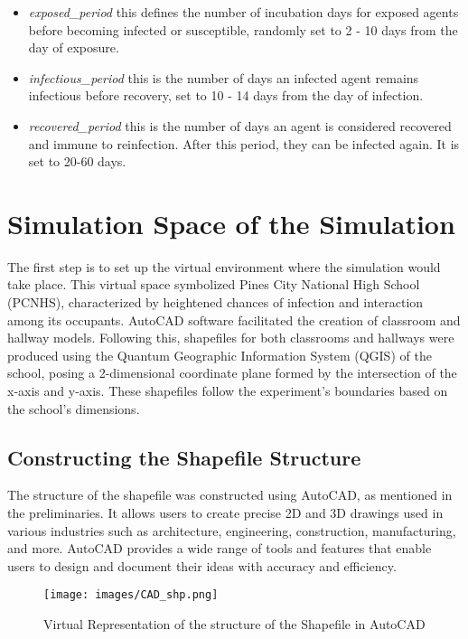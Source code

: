 \begin{itemize}
 	\item \textit{exposed\_period} this defines the number of incubation days for exposed agents before becoming infected or susceptible, randomly set to 2 - 10 days from the day of exposure.
 	
 	\item \textit{infectious\_period} this is the number of days an infected agent remains infectious before recovery, set to 10 - 14 days from the day of infection.
 	
 	\item \textit{recovered\_period} this is the number of days an agent is considered recovered and immune to reinfection. After this period, they can be infected again. It is set to 20-60 days.
 	
 \end{itemize}
 
  \section{Simulation Space of the Simulation}
 
 
 The first step is to set up the virtual environment where the simulation would take place. This virtual space symbolized Pines City National High School (PCNHS), characterized by heightened chances of infection and interaction among its occupants. AutoCAD software facilitated the creation of classroom and hallway models. Following this, shapefiles for both classrooms and hallways were produced using the Quantum Geographic Information System (QGIS) of the school, posing a 2-dimensional coordinate plane formed by the intersection of the x-axis and y-axis. These shapefiles follow the experiment's boundaries based on the school's dimensions.
 
 \subsection{Constructing the Shapefile Structure}
 
 The structure of the shapefile was constructed using AutoCAD, as mentioned in the preliminaries. It allows users to create precise 2D and 3D drawings used in various industries such as architecture, engineering, construction, manufacturing, and more. AutoCAD provides a wide range of tools and features that enable users to design and document their ideas with accuracy and efficiency. 
 
 \begin{figure}[H]
 	\centering
 	\texttt{[image: images/CAD\_shp.png]}
 	\caption{Virtual Representation of the structure of the Shapefile in AutoCAD}
 	\label{cad_shp}
 \end{figure}   
 
